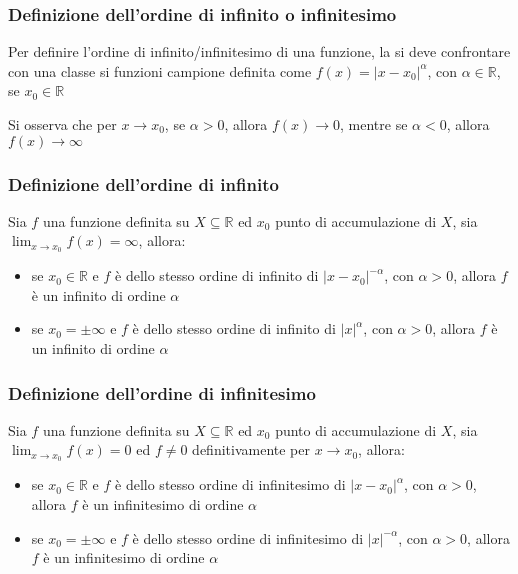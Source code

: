 \documentclass[a4paper]{article}
\begin{document}
\subsubsection*{Definizione dell'ordine di infinito o infinitesimo}
Per definire l'ordine di infinito/infinitesimo di una funzione, la si deve confrontare con una classe si funzioni campione definita
come \(f(x) = \left| x - x_0 \right| ^ \alpha\), con \(\alpha \in \mathbb{R}\), se \(x_0 \in \mathbb{R}\)

Si osserva che per \(x \to x_0\), se \(\alpha > 0\), allora \(f(x) \to 0\), mentre se \(\alpha < 0\), allora \(f(x) \to \infty\)

\subsubsection*{Definizione dell'ordine di infinito}
Sia \(f\) una funzione definita su \(X \subseteq \mathbb{R}\) ed \(x_0\) punto di accumulazione di \(X\), sia \(\displaystyle \lim_{x \to x_0} f(x) = \infty\), allora:
\begin{itemize}
	\item se \(x_0 \in \mathbb{R}\) e \(f\) è dello stesso ordine di infinito di \(\left| x - x_0 \right| ^ {-\alpha}\), con \(\alpha > 0\),
	allora \(f\) è un infinito di ordine \(\alpha\)
	\item se \(x_0 = \pm \infty\) e \(f\) è dello stesso ordine di infinito di \(\left| x \right| ^ \alpha\), con \(\alpha > 0\),
	allora \(f\) è un infinito di ordine \(\alpha\)
\end{itemize}

\subsubsection*{Definizione dell'ordine di infinitesimo}
Sia \(f\) una funzione definita su \(X \subseteq \mathbb{R}\) ed \(x_0\) punto di accumulazione di \(X\), sia \(\displaystyle \lim_{x \to x_0} f(x) = 0\)
ed \(f \neq 0\) definitivamente per \(x \to x_0\), allora:
\begin{itemize}
	\item se \(x_0 \in \mathbb{R}\) e \(f\) è dello stesso ordine di infinitesimo di \(\left| x - x_0 \right| ^ \alpha\), con \(\alpha > 0\),
	allora \(f\) è un infinitesimo di ordine \(\alpha\)
	\item se \(x_0 = \pm \infty\) e \(f\) è dello stesso ordine di infinitesimo di \(\left| x \right| ^ {-\alpha}\), con \(\alpha > 0\),
	allora \(f\) è un infinitesimo di ordine \(\alpha\)
\end{itemize}
\end{document}
